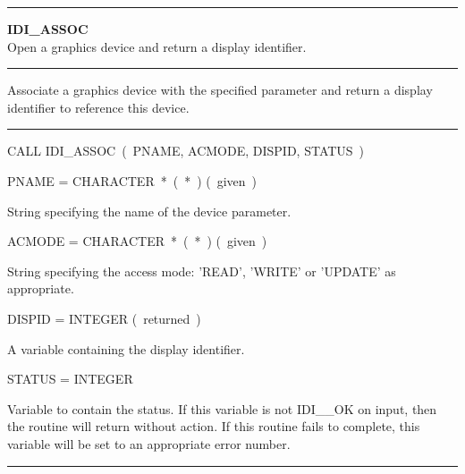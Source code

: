 \parbox{160mm}{

\rule{160mm}{0.5mm}

\hspace*{10mm}\parbox{140mm}{
{\bf IDI\_ASSOC\label{IDI_ASSOC}} \\
Open a graphics device and return a display identifier.}

\rule{160mm}{0.1mm}

\hspace*{10mm}\parbox{140mm}{
Associate a graphics device with the specified parameter and return a
display identifier to reference this device.}

\rule{160mm}{0.1mm}

\hspace*{10mm}\parbox{140mm}{
CALL IDI\_ASSOC~(~PNAME, ACMODE, DISPID, STATUS~)}

\hspace*{10mm}\parbox{140mm}{
PNAME = CHARACTER~*~(~*~) \hspace{10mm} (~given~)}

\hspace*{30mm}\parbox{120mm}{
String specifying the name of the device parameter.}

\hspace*{10mm}\parbox{140mm}{
ACMODE = CHARACTER~*~(~*~) \hspace{10mm} (~given~)}

\hspace*{30mm}\parbox{120mm}{
String specifying the access mode: 'READ', 'WRITE' or 'UPDATE' as
appropriate.}

\hspace*{10mm}\parbox{140mm}{
DISPID = INTEGER \hspace{10mm} (~returned~)}

\hspace*{30mm}\parbox{120mm}{
A variable containing the display identifier.}

\hspace*{10mm}\parbox{140mm}{
STATUS = INTEGER}

\hspace*{30mm}\parbox{120mm}{
Variable to contain the status. If this variable is not IDI\_\_OK on input,
then the routine will return without action. If this routine fails to
complete, this variable will be set to an appropriate error number.}

\rule{160mm}{0.5mm}
}

